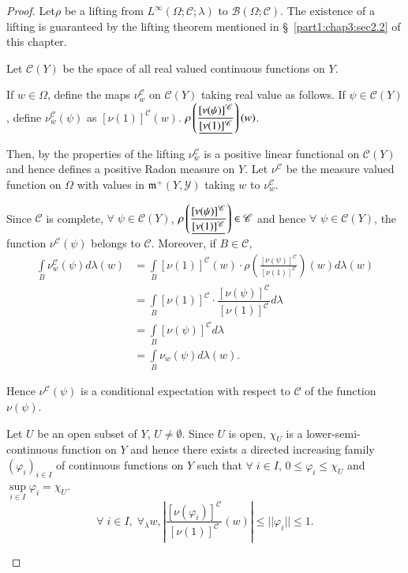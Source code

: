 \begin{proof}
Let\pageoriginale $\rho$ be a lifting from $L^\infty (\Omega;
\mathscr{C}; \lambda)$ to $\mathscr{B}(\Omega; \mathscr{C})$. The
existence of a lifting is guaranteed by the lifting theorem mentioned
in \S\ \ref{part1:chap3:sec2.2} of this chapter.

Let $\mathscr{C}(Y)$ be the space of all real valued continuous
functions on $Y$. 

If $w \in\Omega$, define the maps $\nu^\mathscr{C}_w$ on
$\mathscr{C}(Y)$ taking real value as follows. If $\psi \in
\mathscr{C}(Y)$, define $\nu^\mathscr{C}_w(\psi)$ as
$[\nu(1)]^\mathscr{C}
(w)$. $\rho\left(\dfrac{[\nu(\psi)]^\mathscr{C}}{\underline{[\nu(1)]^\mathscr{C}}}
\right) 
(w)$.  

Then, by the properties of the lifting $\nu^\mathscr{C}_w$ is a
positive linear functional on $\mathscr{C}(Y)$ and hence defines a
positive Radon measure on $Y$. Let $\nu^\mathscr{C}$ be the measure
valued function on $\Omega$ with values in $\mathfrak{m}^+ (Y,
\mathscr{Y})$ taking $w$ to $\nu^\mathscr{C}_w$. 

Since $\mathscr{C}$ is complete, $\forall \; \psi \in \mathscr{C}(Y)$,
$\rho \left( \dfrac{[\nu
    (\psi)]^\mathscr{C}}{\underline{[\nu(1)]^\mathscr{C}}}\right) \in
\mathscr{C}$ and hence
$\forall$ $\psi \in \mathscr{C}(Y)$, the function
$\nu^\mathscr{C}(\psi)$ belongs to $\mathscr{C}$. Moreover, if $B
\in\mathscr{C}$, 
\begin{align*}
\int\limits_B \nu^\mathscr{C}_w (\psi) d \lambda(w) & = \int\limits_B
           [\nu(1)]^\mathscr{C} (w) \cdot \rho \left(
           \frac{[\nu(\psi)]^\mathscr{C}}{[\nu(1)]^\mathscr{C}}\right)
           (w) d \lambda(w)\\
& = \int\limits_B [\nu(1)]^\mathscr{C} \cdot
           \dfrac{[\nu(\psi)]^\mathscr{C}}{[\nu(1)]^\mathscr{C}}  d
           \lambda \\
& = \int\limits_B [\nu(\psi)]^\mathscr{C} d\lambda\\
& = \int\limits_B \nu_w(\psi) d \lambda(w). 
\end{align*}

Hence $\nu^\mathscr{C}(\psi)$ is a conditional expectation with
respect to $\mathscr{C}$ of the function $\nu(\psi)$. 

\begin{step}\label{part1:chap3:step2}
Let $U$ be an open subset of $Y$, $U \neq \emptyset$. Since $U$ is
open, $\chi_U$ is a lower-semi-continuous function on $Y$ and hence
there exists a directed increasing family $(\varphi_i)_{i \in I}$ of
continuous functions on $Y$ such that $\forall \; i \in I$, $0 \leq
\varphi_i \leq \chi_U$ and $\sup\limits_{i \in I} \varphi_i =
\chi_U$. 
$$
\forall \; i \in I, \; \forall_\lambda w, \left|
\dfrac{[\nu(\varphi_i)]^\mathscr{C}}{[\nu(1)]^\mathscr{C}}  (w)\right|
\leq ||\varphi_i|| \leq 1. 
$$
\end{step}


\end{proof}

